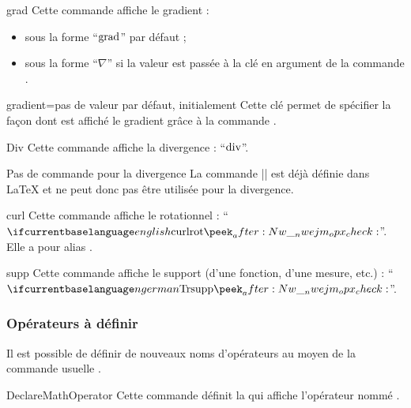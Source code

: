 \begin{docCommand}{grad}{}
  Cette commande affiche le gradient :
  \begin{itemize}
  \item sous la forme \enquote{$\operatorname{grad}$} par défaut ;
  \item sous la forme \enquote{$\nabla$} si la valeur  est
    passée à la clé  en argument de la commande
    .
  \end{itemize}
  \begin{docKey}{gradient}{=\textbar{}}{pas
      de valeur par défaut, initialement }
    Cette clé permet de spécifier la façon dont est affiché le gradient grâce
    à la commande .
  \end{docKey}
\end{docCommand}

\begin{docCommand}{Div}{}
  Cette commande affiche la divergence : \enquote{$\operatorname{div}$}.
  \begin{dbremark}{Pas de commande \protect{} pour la divergence}{}
    La commande |\div| est déjà définie dans \LaTeX{} et ne peut donc pas être
    utilisée pour la divergence.
  \end{dbremark}
\end{docCommand}

\begin{docCommand}{curl}{}
  Cette commande affiche le rotationnel :
  \enquote{$\curl$}. Elle a pour alias .
\end{docCommand}

\begin{docCommand}{supp}{}
  Cette commande affiche le support (d'une fonction, d'une mesure, etc.) :
  \enquote{$\supp$}.
\end{docCommand}

\subsubsection{Opérateurs à définir}

Il est possible de définir de nouveaux noms d'opérateurs au moyen de la commande
usuelle .

\begin{docCommand}{DeclareMathOperator}{}
  Cette commande définit la  qui affiche l'opérateur nommé
  .
\end{docCommand}


